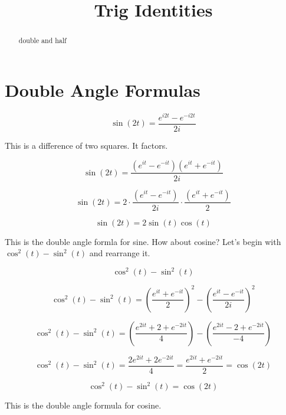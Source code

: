 \documentclass{ximera}
\title{Trig Identities}
\begin{document}
\begin{abstract}
double and half
\end{abstract}
\maketitle






\section*{Double Angle Formulas}


\[   \sin(2t) = \frac{e^{i 2t} - e^{-i 2t}}{2 i}      \]


This is a difference of two squares.  It factors.



\[   \sin(2t) = \frac{(e^{i t} - e^{-i t})(e^{i t} + e^{-i t})}{2 i}      \]




\[   \sin(2t) = 2 \cdot \frac{(e^{i t} - e^{-i t})}{2i}    \cdot    \frac{(e^{i t} + e^{-i t})}{2}      \]



\[   \sin(2t) = 2 \sin(t)   \cos(t)      \]

This is the double angle formla for sine.  How about cosine?
Let's begin with $\cos^2(t) - \sin^2(t)$ and rearrange it.











\[      \cos^2(t) - \sin^2(t)      \]



\[      \cos^2(t) - \sin^2(t)   = \left( \frac{e^{i t} + e^{-i t}}{2} \right)^2 - \left( \frac{e^{i t} - e^{-i t}}{2i} \right)^2  \]


\[      \cos^2(t) - \sin^2(t)   = \left( \frac{e^{2i t} + 2 + e^{-2i t}}{4} \right) - \left( \frac{e^{2 i t} - 2 + e^{-2i t}}{-4} \right)  \]



\[      \cos^2(t) - \sin^2(t)   = \frac{2 e^{2i t}  + 2 e^{-2i t}}{4}   = \frac{e^{2i t}  + e^{-2i t}}{2} = \cos(2t)   \]




\[      \cos^2(t) - \sin^2(t)  = \cos(2t)    \]


This is the double angle formula for cosine. \\
\end{document}
